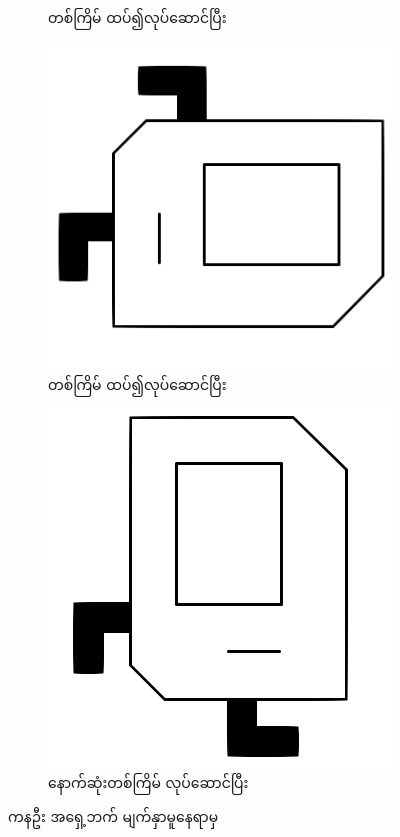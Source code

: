 \begin{sloppypar}
\begin{figure}[tbh!]
\begin{subfigure}[t]{0.4\textwidth}
        \caption{ တစ်ကြိမ် ထပ်၍လုပ်ဆောင်ပြီး}
    \end{subfigure}
    \begin{subfigure}[t]{0.4\textwidth}
        \includegraphics[scale=0.2, left]{ch01/karel_icon_S.png}
        \caption{ တစ်ကြိမ် ထပ်၍လုပ်ဆောင်ပြီး}
    \end{subfigure}
    \begin{subfigure}[t]{0.4\textwidth}
        \includegraphics[scale=0.2, left]{ch01/karel_icon_E.png}
        \caption{ နောက်ဆုံးတစ်ကြိမ် လုပ်ဆောင်ပြီး}
    \end{subfigure}
    \caption{ကနဦး အရှေ့ဘက် မျက်နှာမူနေရာမှ}
    \label{fig:bef_and_after_turnLeft}
\end{figure}


\end{sloppypar}
